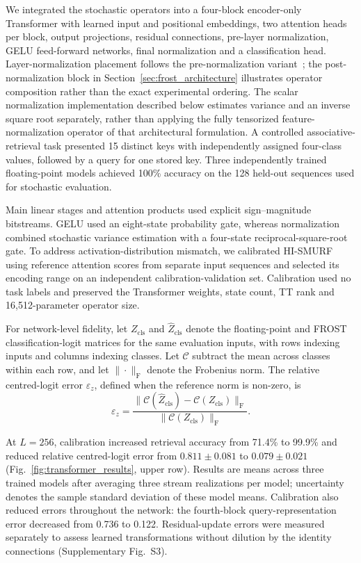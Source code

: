 \documentclass[pdflatex,sn-mathphys-num]{sn-jnl}
\theoremstyle{thmstyleone}
\theoremstyle{thmstyletwo}
\theoremstyle{thmstylethree}
\begin{document}
We integrated the stochastic operators into a four-block encoder-only
Transformer with learned input and positional embeddings, two attention
heads per block, output projections, residual connections, pre-layer
normalization, GELU feed-forward networks, final normalization and a
classification head. Layer-normalization placement follows the pre-normalization variant~\cite{xiong2020layer}; the post-normalization block in Section~\ref{sec:frost_architecture} illustrates operator composition rather than the exact experimental ordering. The scalar normalization implementation described below estimates variance and an inverse square root separately, rather than applying the fully tensorized feature-normalization operator of that architectural formulation.
A controlled associative-retrieval task presented 15 distinct keys
with independently assigned four-class values, followed by a query
for one stored key. Three independently trained floating-point models
achieved 100\% accuracy on the 128 held-out sequences used for
stochastic evaluation.

Main linear stages and attention products used explicit
sign--magnitude bitstreams. GELU used an eight-state probability gate,
whereas normalization combined stochastic variance estimation with a
four-state reciprocal-square-root gate.
To address activation-distribution mismatch, we calibrated HI-SMURF
using reference attention scores from separate input sequences and
selected its encoding range on an independent calibration-validation
set. Calibration used no task labels and preserved the Transformer
weights, state count, TT rank and 16,512-parameter operator size.

For network-level fidelity, let $Z_{\mathrm{cls}}$ and $\widehat{Z}_{\mathrm{cls}}$ denote the floating-point and FROST classification-logit matrices for the same evaluation inputs, with rows indexing inputs and columns indexing classes. Let $\mathcal{C}$ subtract the mean across classes within each row, and let $\|\cdot\|_{\mathrm{F}}$ denote the Frobenius norm. The relative centred-logit error $\varepsilon_z$, defined when the reference norm is non-zero, is
\begin{equation}
\varepsilon_z = \frac{\|\mathcal{C}(\widehat{Z}_{\mathrm{cls}})-\mathcal{C}(Z_{\mathrm{cls}})\|_{\mathrm{F}}}{\|\mathcal{C}(Z_{\mathrm{cls}})\|_{\mathrm{F}}}.
\label{eq:centered_logit_error}
\end{equation}

At $L=256$, calibration increased retrieval accuracy from 71.4\%
to 99.9\% and reduced relative centred-logit error from
$0.811\pm0.081$ to $0.079\pm0.021$
(Fig.~\ref{fig:transformer_results}, upper row).
Results are means across three trained models after averaging three
stream realizations per model; uncertainty denotes the sample
standard deviation of these model means.
Calibration also reduced errors throughout the network: the
fourth-block query-representation error decreased from 0.736 to 0.122.
Residual-update errors were measured separately to assess learned
transformations without dilution by the identity connections
(Supplementary Fig.~S3).
\end{document}
